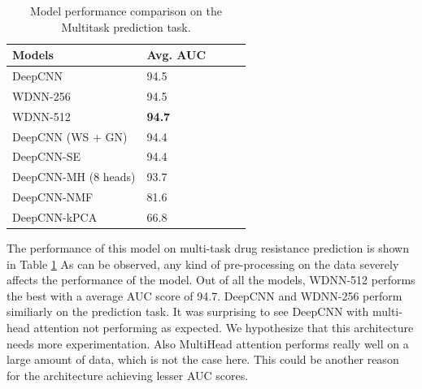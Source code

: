 \documentclass{article}
\begin{document}
\begin{table}[t]
  \centering
  \caption{Model performance comparison on the Multitask prediction task.}
  \begin{tabular}{lllll}
      \toprule
      \multirow{1}{*}[0em]{Models} & Avg. AUC\\
      \midrule
      DeepCNN & 94.5 \\
      WDNN-256 & 94.5 \\
      WDNN-512 & \textbf{94.7} \\
      DeepCNN (WS + GN) & 94.4 \\
      DeepCNN-SE & 94.4 \\
      DeepCNN-MH (8 heads) & 93.7 \\
      DeepCNN-NMF & 81.6 \\
      DeepCNN-kPCA & 66.8 \\
      \bottomrule
  \end{tabular}
  \label{table:model_tb}
\end{table}
The performance of this model on multi-task drug resistance prediction is shown in Table \ref{table:model_tb}
As can be observed, any kind of pre-processing on the data severely affects the performance of the model.
Out of all the models, WDNN-512 performs the best with a average AUC score of 94.7. DeepCNN and WDNN-256
perform similiarly on the prediction task. It was surprising to see DeepCNN with multi-head attention not
performing as expected. We hypothesize that this architecture needs more experimentation. Also MultiHead
attention performs really well on a large amount of data, which is not the case here. This could be another
reason for the architecture achieving lesser AUC scores.
\end{document}
